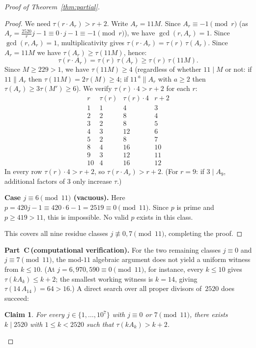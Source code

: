 \documentclass[11pt]{article}
\newtheorem{claim}{Claim}
\begin{document}
\begin{proof}[Proof of Theorem~\ref{thm:partial}]
\begin{proof}
We need $\tau(r \cdot A_r) > r + 2$.
Write $A_r = 11M$.  Since $A_r \equiv -1 \pmod{r}$ (as $A_r = \tfrac{2520}{r}j - 1
\equiv 0\cdot j - 1 \equiv -1 \pmod{r}$), we have $\gcd(r, A_r) = 1$.
Since $\gcd(r,A_r)=1$, multiplicativity gives $\tau(r \cdot A_r) = \tau(r)\,\tau(A_r)$.
Since $A_r = 11M$ we have $\tau(A_r) \ge \tau(11M)$, hence:
\[
  \tau(r \cdot A_r) = \tau(r)\,\tau(A_r) \ge \tau(r)\,\tau(11M).
\]
Since $M \ge 229 > 1$, we have $\tau(11M) \ge 4$ (regardless of whether $11 \mid M$ or not:
if $11 \parallel A_r$ then $\tau(11M) = 2\tau(M) \ge 4$; if $11^{\,a} \parallel A_r$ with $a \ge 2$
then $\tau(A_r) \ge 3\tau(M') \ge 6$).
We verify $\tau(r) \cdot 4 > r + 2$ for each $r$:
\[
  \begin{array}{c|c|c|c}
  r & \tau(r) & \tau(r) \cdot 4 & r+2 \\\hline
  1 & 1 & 4 & 3 \\
  2 & 2 & 8 & 4 \\
  3 & 2 & 8 & 5 \\
  4 & 3 & 12 & 6 \\
  5 & 2 & 8 & 7 \\
  8 & 4 & 16 & 10 \\
  9 & 3 & 12 & 11 \\
  10 & 4 & 16 & 12
  \end{array}
\]
In every row $\tau(r) \cdot 4 > r+2$, so $\tau(r \cdot A_r) > r+2$.
(For $r=9$: if $3 \mid A_9$, additional factors of $3$ only increase $\tau$.)

\textbf{Case $j \equiv 6 \pmod{11}$ (vacuous).}
Here $p = 420j - 1 \equiv 420 \cdot 6 - 1 = 2519 \equiv 0 \pmod{11}$.
Since $p$ is prime and $p \ge 419 > 11$, this is impossible.  No valid $p$ exists in this class.

This covers all nine residue classes $j \not\equiv 0, 7 \pmod{11}$, completing the proof.
\end{proof}

\medskip\noindent\textbf{Part~C\,(computational verification).}
For the two remaining classes $j \equiv 0$ and $j \equiv 7 \pmod{11}$, the mod-$11$
algebraic argument does not yield a uniform witness from $k \le 10$.  (At
$j = 6{,}970{,}590 \equiv 0 \pmod{11}$, for instance, every $k \le 10$ gives
$\tau(k A_k) \le k+2$; the smallest working witness is $k = 14$, giving
$\tau(14\,A_{14}) = 64 > 16$.)  A direct search over all proper divisors of~$2520$
does succeed:

\begin{claim}\label{claim:finite}
For every $j \in \{1, \ldots, 10^7\}$ with $j \equiv 0$ or $7 \pmod{11}$,
there exists $k \mid 2520$ with $1 \le k < 2520$ such that $\tau(k A_k) > k + 2$.
\end{claim}


\end{proof}
\end{document}
